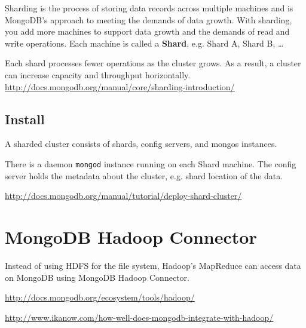 Sharding is the process of storing data records across multiple machines and is
MongoDB's approach to meeting the demands of data growth.  With sharding, you
add more machines to support data growth and the demands of read and write
operations. Each machine is called a {\bf Shard}, e.g. Shard A, Shard B, \ldots

Each shard processes fewer operations as the cluster grows. As a result, a
cluster can increase capacity and throughput horizontally.
\url{http://docs.mongodb.org/manual/core/sharding-introduction/}

\subsection{Install}

A sharded cluster consists of shards, config servers, and mongos instances.

There is a daemon \verb!mongod! instance running on each Shard machine.
The config server holds the metadata about the cluster, e.g. shard location of
the data. 

\url{http://docs.mongodb.org/manual/tutorial/deploy-shard-cluster/}








\section{MongoDB Hadoop Connector}
\label{sec:MongoDB_Hadoop-Connector}

Instead of using HDFS for the file system, Hadoop's MapReduce can
access data on MongoDB using MongoDB Hadoop Connector. 

\url{http://docs.mongodb.org/ecosystem/tools/hadoop/}


\url{http://www.ikanow.com/how-well-does-mongodb-integrate-with-hadoop/}



